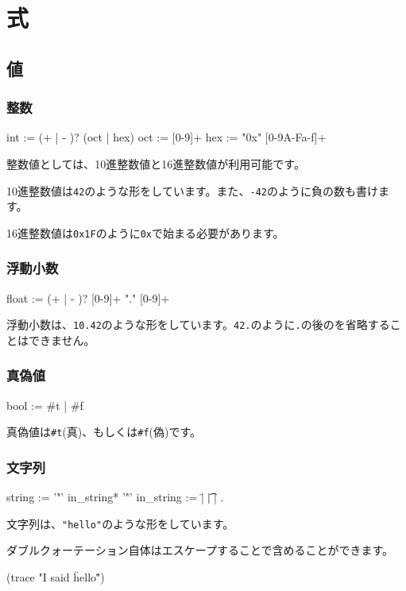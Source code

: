 \documentclass[draft]{article}
\begin{document}
\section{式}
\subsection{値}
\subsubsection{整数}

\begin{bnf}
int :=  (+ | - )? (oct | hex)
oct :=  [0-9]+
hex :=  "0x" [0-9A-Fa-f]+
\end{bnf}

整数値としては、10進整数値と16進整数値が利用可能です。

10進整数値は\verb!42!のような形をしています。また、\verb!-42!のように負の数も書けます。

16進整数値は\verb!0x1F!のように\verb!0x!で始まる必要があります。

\subsubsection{浮動小数}
\begin{bnf}
float :=  (+ | - )? [0-9]+ "." [0-9]+
\end{bnf}

浮動小数は、\verb!10.42!のような形をしています。\verb!42.!のように\verb!.!の後のを省略することはできません。

\subsubsection{真偽値}
\begin{bnf}
bool := #t | #f
\end{bnf}

真偽値は\verb!#t!(真)、もしくは\verb!#f!(偽)です。

\subsubsection{文字列}
\begin{bnf}
string    := '"' in_string* '"'
in_string := \" | \t | \n | .
\end{bnf}

文字列は、\verb!"hello"!のような形をしています。

ダブルクォーテーション自体はエスケープすることで含めることができます。
\begin{code}
(trace "I said \"hello\"")
\end{code}
\end{document}
